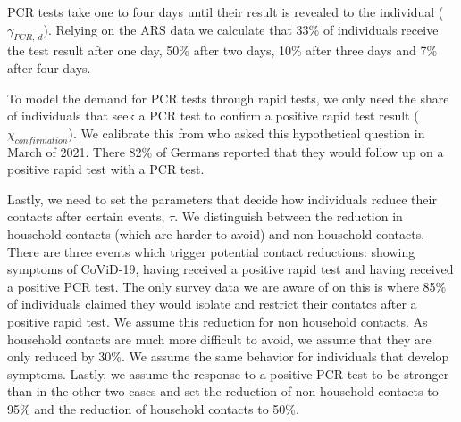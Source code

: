 PCR tests take one to four days until their result is revealed to the individual
($\gamma_{PCR,\:d}$). Relying on the ARS data \citep{ARS2020} we calculate that 33\% of
individuals receive the test result after one day, 50\% after two days, 10\% after three
days and 7\% after four days.

To model the demand for PCR tests through rapid tests, we only need the share of
individuals that seek a PCR test to confirm a positive rapid test result
($\chi_{confirmation}$). We calibrate this from \citet{Betsch2021} who asked this
hypothetical question in March of 2021. There 82\% of Germans reported that they would
follow up on a positive rapid test with a PCR test.


Lastly, we need to set the parameters that decide how individuals reduce their contacts
after certain events, $\tau$. We distinguish between the reduction in household contacts
(which are harder to avoid) and non household contacts. There are three events which
trigger potential contact reductions: showing symptoms of CoViD-19, having received a
positive rapid test and having received a positive PCR test. The only survey data we are
aware of on this is \citet{Betsch2021} where 85\% of individuals claimed they
would isolate and restrict their contatcs after a positive rapid test. We assume this
reduction for non household contacts. As household contacts are much more difficult to
avoid, we assume that they are only reduced by 30\%. We assume the same behavior for
individuals that develop symptoms. Lastly, we assume the response to a positive PCR test
to be stronger than in the other two cases and set the reduction of non household
contacts to 95\% and the reduction of household contacts to 50\%.

\FloatBarrier